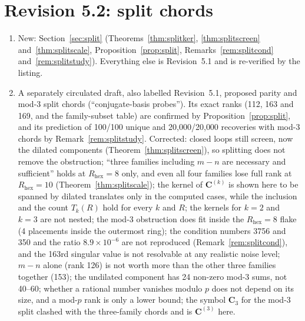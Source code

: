 \documentclass[11pt,a4paper]{article}
\theoremstyle{definition}
\theoremstyle{remark}
\begin{document}
\section*{Revision 5.2: split chords}
\begin{enumerate}[noitemsep,leftmargin=*]
\item New: Section~\ref{sec:split} (Theorems~\ref{thm:splitker}, \ref{thm:splitscreen} and~\ref{thm:splitscale}, Proposition~\ref{prop:split}, Remarks~\ref{rem:splitcond} and~\ref{rem:splitstudy}). Everything else is Revision~5.1 and is re-verified by the listing.
\item A separately circulated draft, also labelled Revision~5.1, proposed parity and mod-3 split chords (``conjugate-basis probes''). Its exact ranks (112, 163 and 169, and the family-subset table) are confirmed by Proposition~\ref{prop:split}, and its prediction of 100/100 unique and 20{,}000/20{,}000 recoveries with mod-3 chords by Remark~\ref{rem:splitstudy}. Corrected:
  closed loops still screen, now the dilated components (Theorem~\ref{thm:splitscreen}), so splitting does not remove the obstruction;
  ``three families including $m-n$ are necessary and sufficient'' holds at $R_{\text{hex}} = 8$ only, and even all four families lose full rank at $R_{\text{hex}} = 10$ (Theorem~\ref{thm:splitscale});
  the kernel of $\mathbf{C}^{(k)}$ is shown here to be spanned by dilated translates only in the computed cases, while the inclusion and the count $T_k(R)$ hold for every $k$ and $R$;
  the kernels for $k = 2$ and $k = 3$ are not nested;
  the mod-3 obstruction does fit inside the $R_{\text{hex}} = 8$ flake (4 placements inside the outermost ring);
  the condition numbers 3756 and 350 and the ratio $8.9\times10^{-6}$ are not reproduced (Remark~\ref{rem:splitcond}), and the 163rd singular value is not resolvable at any realistic noise level;
  $m-n$ alone (rank 126) is not worth more than the other three families together (153);
  the undilated component has 24 non-zero mod-3 sums, not 40--60;
  whether a rational number vanishes modulo $p$ does not depend on its size, and a mod-$p$ rank is only a lower bound;
  the symbol $\mathbf{C}_3$ for the mod-3 split clashed with the three-family chords and is $\mathbf{C}^{(3)}$ here.
\end{enumerate}
\end{document}
